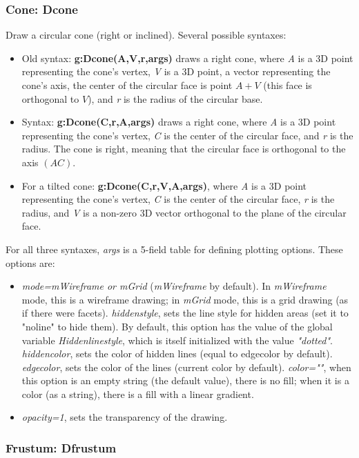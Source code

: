\subsubsection{Cone: Dcone}

Draw a circular cone (right or inclined). Several possible syntaxes:
\begin{itemize}
    \item Old syntax: \textbf{g:Dcone(A,V,r,args)} draws a right cone, where \emph{A} is a 3D point representing the cone's vertex, \emph{V} is a 3D point, a vector representing the cone's axis, the center of the circular face is point $A+V$ (this face is orthogonal to $V$), and \emph{r} is the radius of the circular base.
    \item Syntax: \textbf{g:Dcone(C,r,A,args)} draws a right cone, where \emph{A} is a 3D point representing the cone's vertex, \emph{C} is the center of the circular face, and \emph{r} is the radius. The cone is right, meaning that the circular face is orthogonal to the axis $(AC)$.
    \item For a tilted cone: \textbf{g:Dcone(C,r,V,A,args)}, where \emph{A} is a 3D point representing the cone's vertex, \emph{C} is the center of the circular face, \emph{r} is the radius, and \emph{V} is a non-zero 3D vector orthogonal to the plane of the circular face.
\end{itemize}
For all three syntaxes, \emph{args} is a 5-field table for defining plotting options. These options are:
\begin{itemize}
    \item \emph{mode=mWireframe or mGrid} (\emph{mWireframe} by default). In \emph{mWireframe} mode, this is a wireframe drawing; in \emph{mGrid} mode, this is a grid drawing (as if there were facets).
\emph{hiddenstyle}, sets the line style for hidden areas (set it to "noline" to hide them). By default, this option has the value of the global variable \emph{Hiddenlinestyle}, which is itself initialized with the value \emph{"dotted"}.
\emph{hiddencolor}, sets the color of hidden lines (equal to edgecolor by default).
\emph{edgecolor}, sets the color of the lines (current color by default).
\emph{color=""}, when this option is an empty string (the default value), there is no fill; when it is a color (as a string), there is a fill with a linear gradient.
    \item \emph{opacity=1}, sets the transparency of the drawing.
\end{itemize}

\subsubsection{Frustum: Dfrustum}


